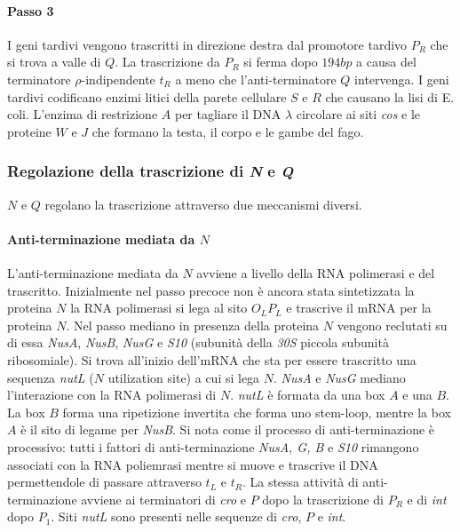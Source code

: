 \paragraph{Passo 3}
I geni tardivi vengono trascritti in direzione destra dal promotore tardivo $P_R$ che si trova a valle di $Q$. La trascrizione da $P_R$ si ferma dopo $194bp$ a causa del terminatore 
$\rho$-indipendente $t_R$ a meno che l'anti-terminatore $Q$ intervenga. I geni tardivi codificano enzimi litici della parete cellulare $S$ e $R$ che causano la lisi di E. coli. 
L'enzima di restrizione $A$ per tagliare il DNA $\lambda$ circolare ai siti \emph{cos} e le proteine $W$ e $J$ che formano la testa, il corpo e le gambe del fago. 
\subsubsection{Regolazione della trascrizione di \emph{N} e \emph{Q}}
$N$ e $Q$ regolano la trascrizione attraverso due meccanismi diversi.
\paragraph{Anti-terminazione mediata da $N$}
L'anti-terminazione mediata da $N$ avviene a livello della RNA polimerasi e del trascritto. Inizialmente nel passo precoce non \`e ancora stata sintetizzata la proteina $N$ la RNA 
polimerasi si lega al sito $O_LP_L$ e trascrive il mRNA per la proteina $N$. Nel passo mediano in presenza della proteina $N$ vengono reclutati su di essa \emph{NusA}, \emph{NusB}, 
\emph{NusG} e \emph{S10} (subunit\`a della \emph{30S} piccola subunit\`a ribosomiale). Si trova all'inizio dell'mRNA che sta per essere trascritto una sequenza \emph{nutL} ($N$ 
utilization site) a cui si lega $N$. \emph{NusA} e \emph{NusG} mediano l'interazione con la RNA polimerasi di $N$. \emph{nutL} \`e formata da una box $A$ e una $B$. La box $B$
forma una ripetizione invertita che forma uno stem-loop, mentre la box $A$ \`e il sito di legame per \emph{NusB}. Si nota come il  processo di anti-terminazione \`e processivo: tutti i 
fattori di anti-terminazione \emph{NusA, G, B} e \emph{S10} rimangono associati con la RNA poliemrasi mentre si muove e trascrive il DNA permettendole di passare attraverso 
$t_L$ e $t_R$. La stessa attivit\`a di anti-terminazione avviene ai terminatori di \emph{cro} e $P$ dopo la trascrizione di $P_R$ e di \emph{int} dopo $P_1$. Siti \emph{nutL} sono
presenti nelle sequenze di \emph{cro}, $P$ e \emph{int}. 
